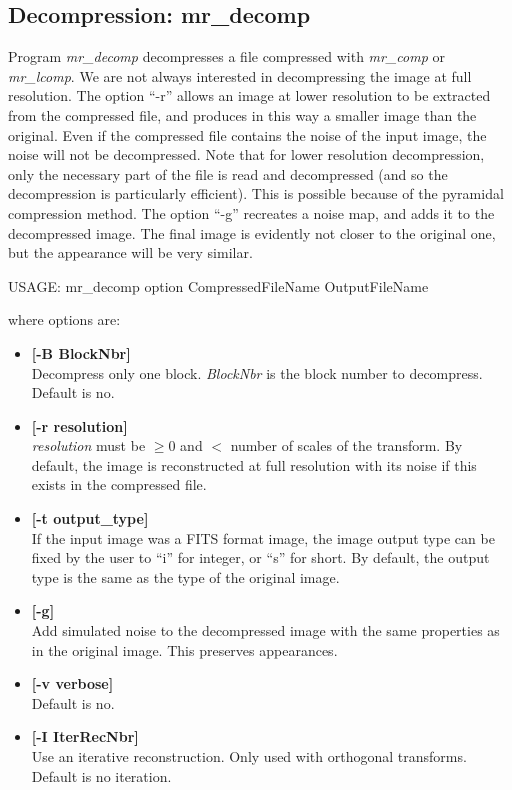 \subsection{Decompression: mr\_decomp}
Program {\em mr\_decomp} decompresses a file compressed with {\em mr\_comp}
or {\em mr\_lcomp}.
We are not always interested in decompressing the image at full resolution. 
The option ``-r'' allows an image at lower resolution to be extracted from 
the compressed file, and produces in this way 
a smaller image than the original. Even if the compressed file contains
the noise of the input image, the noise will not be decompressed.
Note that for lower resolution decompression, only the necessary part of the
file is read and decompressed (and so the decompression is particularly 
efficient). This is possible because of the pyramidal compression method. 
The option ``-g'' recreates a noise map, and adds it to the decompressed image.
The final image is evidently not closer to the original one, but the appearance
will be very similar.

{\bf
\begin{center}
 USAGE: mr\_decomp option CompressedFileName OutputFileName
\end{center}}
where options are:
\begin{itemize}
\baselineskip=0.4truecm
\item {\bf [-B BlockNbr]} \\
Decompress only one block. {\em BlockNbr} is the block number to decompress.
Default is no.
\item {\bf [-r resolution]} \\
{\em resolution} must be $ \geq 0$ and $<$ number of scales of the transform.
By default, the image is reconstructed at full resolution with its noise 
if this exists in the compressed file.
\item {\bf [-t output\_type]} \\
If the input image was a FITS format image, the image 
output type can be fixed 
by the user to ``i'' for integer, or ``s'' for short. 
By default, the output type 
is the same as the type of the original image. 
\item {\bf [-g]} \\
Add simulated noise to the decompressed image with the same properties 
as in the original image. This preserves appearances.
\item {\bf [-v verbose]} \\
Default is no.
\item {\bf [-I IterRecNbr]} \\
Use an iterative reconstruction. Only used with orthogonal transforms.
Default is no iteration.
\end{itemize}
